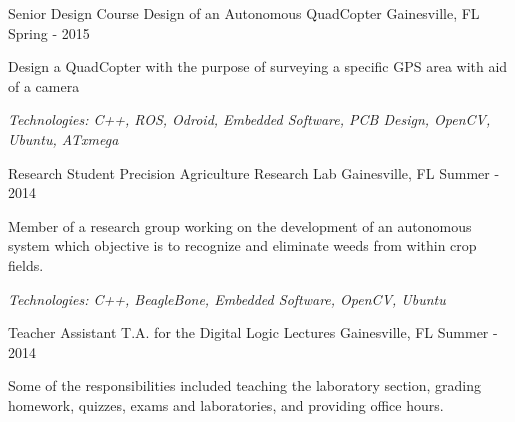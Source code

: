 

\begin{cventries}

  \cventry
    {Senior Design Course} %
    {Design of an Autonomous QuadCopter} %
    {Gainesville, FL} %
    {Spring - 2015} %
    {
      \begin{cvitems} %
				\item {Design a QuadCopter with the purpose of surveying a specific GPS area with aid of a camera}
				\item {\it{Technologies:} C++, ROS, Odroid, Embedded Software, PCB Design, OpenCV, Ubuntu, ATxmega}
      \end{cvitems}
    }

	\cventry
		{Research Student} %
		{Precision Agriculture Research Lab} %
		{Gainesville, FL} %
		{Summer - 2014} %
		{
			\begin{cvitems} %
			\item {Member of a research group working on the development of an autonomous system which 
				objective is to recognize and eliminate weeds from within crop fields.}
			\item {\it{Technologies:} C++, BeagleBone, Embedded Software, OpenCV, Ubuntu}
			\end{cvitems}
		}

	\cventry
		{Teacher Assistant} %
		{T.A. for the Digital Logic Lectures} %
		{Gainesville, FL} %
		{Summer - 2014} %
		{
			\begin{cvitems} %
			\item {Some of the responsibilities included teaching the laboratory section, grading homework, quizzes, exams and
				laboratories, and providing office hours.}
			\end{cvitems}
		}


\end{cventries}
